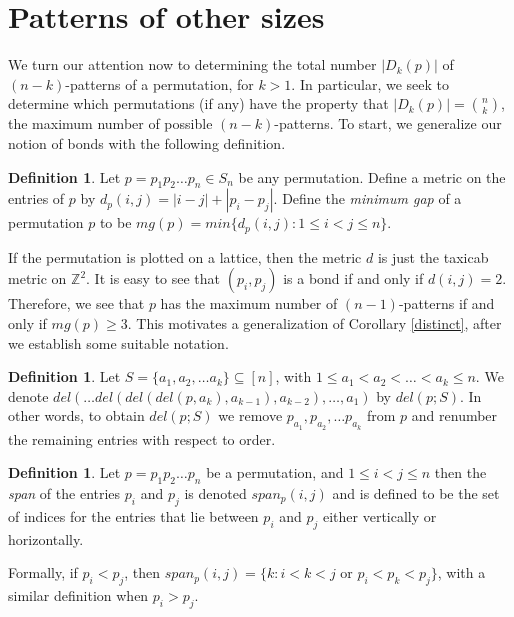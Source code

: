 \documentclass[11pt]{article}
\theoremstyle{plain}
\theoremstyle{definition}
\newtheorem{defn}[thm]{Definition}
\begin{document}
\section{Patterns of other sizes}
	
  We turn our attention now to determining the total number $|D_k(p)|$ of 
  $(n-k)$-patterns of a permutation, for $k >1$. In particular, we seek to
  determine which permutations (if any) have the property that $|D_k(p)| =
  \binom{n}{k}$, the maximum number of possible $(n-k)$-patterns. To start, we
  generalize our notion of bonds with the following definition. 
                  
  \begin{defn} 
  Let $p = p_1p_2 \ldots p_n \in S_n$ be any permutation. Define a metric on the
  entries of $p$ by $d_p(i,j) = |i-j|+|p_i - p_j|$. Define the \emph{minimum gap}
  of a permutation $p$ to be $mg(p) = min\{d_p(i,j):1\leq i < j  \leq n\}$.
  \end{defn}

  If the permutation is plotted on a lattice, then the metric $d$ is just the
  taxicab metric on $\mathbb{Z}^2$. It is easy to see that $(p_i,p_j)$ is a bond
  if and only if $d(i,j) = 2$. Therefore, we see that $p$ has the maximum number
  of $(n-1)$-patterns if and only if $mg(p) \geq 3$. This motivates a
  generalization of Corollary \ref{distinct}, after we establish some suitable
  notation.
    
    
    
    
  \begin{defn} 
  Let $S=\{a_1,a_2, \ldots a_k\}\subseteq [n]$, with $1 \leq a_1<a_2 < \ldots <a_k
  \leq n$. We denote $del( \ldots del(del(del(p,a_k),a_{k-1}),a_{k-2}), \ldots
  ,a_1)$ by $del(p;S)$.  In other words, to obtain $del(p;S)$ we remove
  $p_{a_1}, p_{a_2}, \ldots p_{a_k}$ from $p$ and renumber the remaining entries
  with respect to order.
  \end{defn}
    
        
    
  \begin{defn} 
  Let $p=p_1p_2 \ldots p_n$ be a permutation, and $1\leq i < j \leq n$ then the
  \emph{span} of the entries $p_i$ and $p_j$ is denoted $span_p(i,j)$ and is
  defined to be the set of indices for the entries that lie between $p_i$
  and $p_j$ either vertically or horizontally. 

  Formally, if $p_i < p_j$, then $span_p(i,j) = \{k : i<k<j \text{ \ or \ } p_i
  < p_k < p_j \}$, with a similar definition when $p_i> p_j$.  
  \end{defn}
\end{document}
